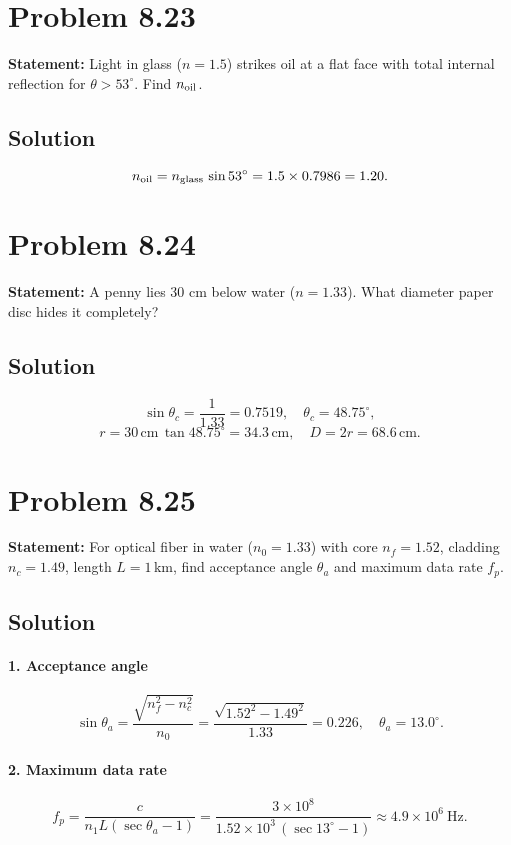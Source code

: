 \section*{Problem 8.23}
\textbf{Statement:} Light in glass ($n=1.5$) strikes oil at a flat face with total internal reflection for $\theta>53^\circ$. Find $n_{\rm oil}$.

\subsection*{Solution}
\[
n_{\rm oil} = n_{\rm glass}\,\sin53^\circ
= 1.5\times0.7986
= 1.20.
\]

\section*{Problem 8.24}
\textbf{Statement:} A penny lies 30 cm below water ($n=1.33$). What diameter paper disc hides it completely?

\subsection*{Solution}
\[
\sin\theta_c = \frac{1}{1.33} = 0.7519,\quad \theta_c = 48.75^\circ,
\]
\[
r = 30\,\mathrm{cm}\,\tan48.75^\circ = 34.3\,\mathrm{cm},
\quad
D = 2r = 68.6\,\mathrm{cm}.
\]

\section*{Problem 8.25}
\textbf{Statement:} For optical fiber in water ($n_0=1.33$) with core $n_f=1.52$, cladding $n_c=1.49$, length $L=1\,$km, find acceptance angle $\theta_a$ and maximum data rate $f_p$.

\subsection*{Solution}
\paragraph{1. Acceptance angle}
\[
\sin\theta_a
= \frac{\sqrt{n_f^2 - n_c^2}}{n_0}
= \frac{\sqrt{1.52^2 - 1.49^2}}{1.33}
= 0.226,\quad
\theta_a = 13.0^\circ.
\]

\paragraph{2. Maximum data rate}
\[
f_p 
= \frac{c}{n_1 L(\sec\theta_a - 1)}
= \frac{3\times10^8}{1.52 \times 10^3\,(\sec13^\circ - 1)}
\approx 4.9\times10^6\ \mathrm{Hz}.
\]

